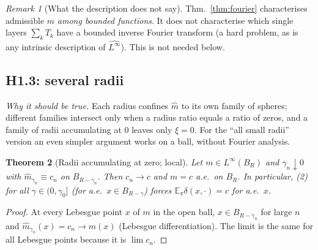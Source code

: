 \documentclass[11pt,a4paper]{article}
\numberwithin{equation}{section}
\newtheorem{theorem}{Theorem}[section]
\theoremstyle{definition}
\theoremstyle{remark}
\newtheorem{remark}[theorem]{Remark}
\newcommand{\E}{\mathbb E}\newcommand{\R}{\mathbb R}\newcommand{\N}{\mathbb N}\newcommand{\Prob}{\mathbb P}
\begin{document}
\begin{remark}[What the description does not say]
Thm.~\ref{thm:fourier} characterises admissible $m$ \emph{among bounded functions}. It does not characterise which single layers $\sum_kT_k$ have a bounded inverse Fourier transform (a hard problem, as is any intrinsic description of $\widehat{L^\infty}$). This is not needed below.
\end{remark}

\subsection{H1.3: several radii}
\emph{Why it should be true.} Each radius confines $\hat m$ to its own family of spheres; different families intersect only when a radius ratio equals a ratio of zeros, and a family of radii accumulating at $0$ leaves only $\xi=0$. For the ``all small radii'' version an even simpler argument works on a ball, without Fourier analysis.

\begin{theorem}[Radii accumulating at zero; local]\label{thm:allgamma}
Let $m\in L^\infty(B_R)$ and $\gamma_n\downarrow0$ with $\hat m_{\gamma_n}\equiv c_n$ on $B_{R-\gamma_n}$. Then $c_n\to c$ and $m=c$ a.e.\ on $B_R$. In particular, (2) for all $\gamma\in(0,\gamma_0]$ (for a.e.\ $x\in B_{R-\gamma}$) forces $\E_\pi\delta(x,\cdot)=c$ for a.e.\ $x$.
\end{theorem}
\begin{proof}
At every Lebesgue point $x$ of $m$ in the open ball, $x\in B_{R-\gamma_n}$ for large $n$ and $\hat m_{\gamma_n}(x)=c_n\to m(x)$ (Lebesgue differentiation). The limit is the same for all Lebesgue points because it is $\lim c_n$.
\end{proof}
\end{document}
